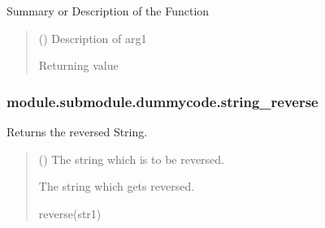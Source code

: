 \documentclass[letterpaper,10pt,english]{sphinxmanual}
\begin{document}
\begin{fulllineitems}
\label{\detokenize{_autosummary/module.submodule.dummycode.some_function:module.submodule.dummycode.some_function}}
\pysigstartsignatures
{}
\pysigstopsignatures
\sphinxAtStartPar
Summary or Description of the Function
\begin{quote}\begin{description}
\sphinxAtStartPar
{} () \textendash{} Description of arg1

\sphinxAtStartPar
Returning value

\sphinxAtStartPar
{}

\end{description}\end{quote}

\end{fulllineitems}


\sphinxstepscope


\subsubsection{module.submodule.dummycode.string\_reverse}
\label{\detokenize{_autosummary/module.submodule.dummycode.string_reverse:module-submodule-dummycode-string-reverse}}\label{\detokenize{_autosummary/module.submodule.dummycode.string_reverse::doc}}

\begin{fulllineitems}
\label{\detokenize{_autosummary/module.submodule.dummycode.string_reverse:module.submodule.dummycode.string_reverse}}
\pysigstartsignatures
{}
\pysigstopsignatures
\sphinxAtStartPar
Returns the reversed String.
\begin{quote}\begin{description}
\sphinxAtStartPar
{} () \textendash{} The string which is to be reversed.

\sphinxAtStartPar
The string which gets reversed.

\sphinxAtStartPar
reverse(str1)

\end{description}\end{quote}

\end{fulllineitems}
\end{document}
